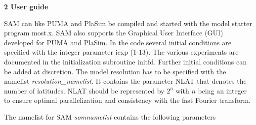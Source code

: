{\bf 2 User guide}

\nopagebreak[4]

SAM can like PUMA and PlaSim be compiled and started with the model starter program most.x.
SAM also supports the Graphical User Interface (GUI) developed for PUMA and PlaSim.
In the code several initial conditions are specified with the integer parameter iexp (1-13).
The various experiments are documented in the initialization subroutine initfd. Further
initial conditions can be added at discretion. The model resolution has to be specified with the
namelist {\it resolution\_namelist}. It contains the parameter NLAT that denotes the number of
latitudes. NLAT should be represented by $2^{n}$ with $n$ being an integer to ensure
optimal parallelization and consistency with the fast Fourier transform.

The namelist for SAM {\it somnamelist} contains the following parameters

